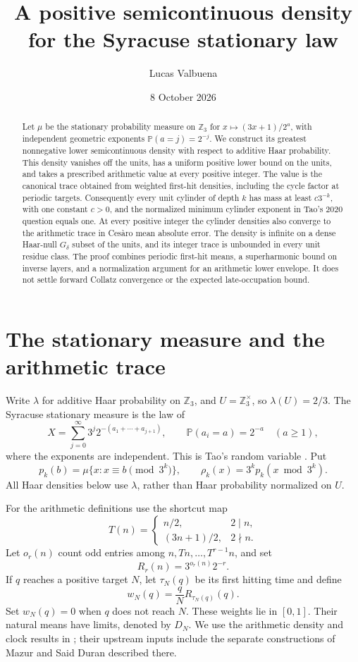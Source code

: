 \documentclass[11pt]{article}
\title{A positive semicontinuous density\\for the Syracuse stationary law}
\author{Lucas Valbuena}
\date{8 October 2026}
\theoremstyle{remark}
\newcommand{\Zthree}{\mathbb Z_3}
\begin{document}
\maketitle

\begin{abstract}
Let \(\mu\) be the stationary probability measure on \(\Zthree\)
for \(x\mapsto(3x+1)/2^a\), with independent geometric exponents
\(\mathbb P(a=j)=2^{-j}\). We construct its greatest nonnegative
lower semicontinuous density with respect to additive Haar probability.
This density vanishes off the units, has a uniform positive lower bound
on the units, and takes a prescribed arithmetic value at every positive
integer. The value is the canonical trace obtained from weighted
first-hit densities, including the cycle factor at periodic targets.
Consequently every unit cylinder of depth \(k\) has mass at least
\(c3^{-k}\), with one constant \(c>0\), and the normalized minimum
cylinder exponent in Tao's 2020 question equals one. At every positive
integer the cylinder densities also converge to the arithmetic trace
in Ces\`aro mean absolute error. The density is infinite on a dense
Haar-null \(G_\delta\) subset of the units, and its integer trace is
unbounded in every unit residue class. The proof combines periodic first-hit
means, a superharmonic bound on inverse layers, and a normalization
argument for an arithmetic lower envelope. It does not settle forward
Collatz convergence or the expected late-occupation bound.
\end{abstract}

\section{The stationary measure and the arithmetic trace}

Write \(\lambda\) for additive Haar probability on \(\Zthree\),
and \(U=\Zthree^\times\), so \(\lambda(U)=2/3\).
The Syracuse stationary measure is the law of
\[
 X=\sum_{j=0}^{\infty}3^j2^{-(a_1+\cdots+a_{j+1})},
 \qquad \mathbb P(a_i=a)=2^{-a}\quad(a\geq1),
\]
where the exponents are independent. This is Tao's random variable
\cite{Tao}. Put
\[
 p_k(b)=\mu\{x:x\equiv b\pmod{3^k}\},\qquad
 \rho_k(x)=3^k p_k(x\bmod3^k).
\]
All Haar densities below use \(\lambda\), rather than Haar
probability normalized on \(U\).

For the arithmetic definitions use the shortcut map
\[
 T(n)=\begin{cases}n/2,&2\mid n,\\(3n+1)/2,&2\nmid n.\end{cases}
\]
Let \(o_r(n)\) count odd entries among
\(n,Tn,\ldots,T^{r-1}n\), and set
\[
 R_r(n)=3^{o_r(n)}2^{-r}.
\]
If \(q\) reaches a positive target \(N\), let \(\tau_N(q)\)
be its first hitting time and define
\[
 w_N(q)=\frac{q}{N}R_{\tau_N(q)}(q).
\]
Set \(w_N(q)=0\) when \(q\) does not reach \(N\).
These weights lie in \([0,1]\). Their natural means have limits,
denoted by \(D_N\). We use the arithmetic density and clock results
in \cite{Basins}; their upstream inputs include the separate
constructions of Mazur and Said Duran described there.
\end{document}

